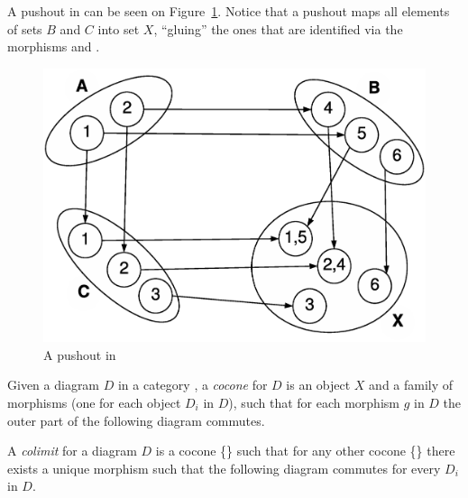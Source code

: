 \begin{example} A pushout in  can be seen on Figure~\ref{fig:gts:pushout}. Notice that a pushout maps all elements of sets $B$ and $C$ into set $X$, ``gluing'' the ones that are identified via the morphisms  and .

\begin{figure}[!ht]
  \centering
  \includegraphics[scale=0.4]{images/gts/pushout}
  \caption{A pushout in  }\label{fig:gts:pushout}
\end{figure}

\end{example}

\begin{definition}[Colimit] Given a diagram $D$ in a category , a \emph{cocone} for $D$ is an object $X$ and a family of morphisms  (one for each object $D_i$ in $D$), such that for each morphism $g$ in $D$ the outer part of the following diagram commutes.

\hfill

  A \emph{colimit} for a diagram $D$ is a cocone \{\} such that for any other cocone \{\} there exists a unique morphism  such that the following diagram commutes for every $D_i$ in $D$.


\end{definition}

